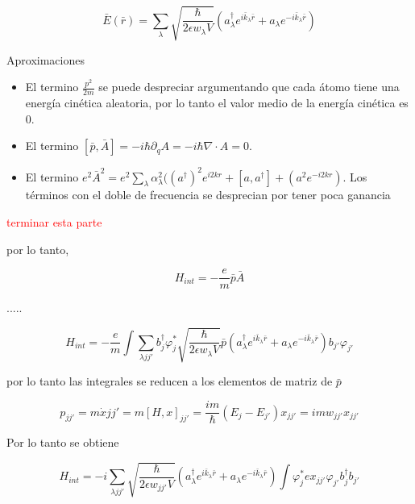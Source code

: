 \begin{equation}
\bar{E}(\bar{r})=\sum_{\lambda}\sqrt{\frac{\hbar}{2\epsilon w_{\lambda}V}} (a^{\dagger}_{\lambda}e^{i\bar{k}_{\lambda}\bar{r}}+a_{\lambda}e^{-i\bar{k}_{\lambda}\bar{r}})
\end{equation}

Aproximaciones

\begin{itemize}
	\item El termino $\frac{p^2}{2m}$ se puede despreciar argumentando que cada átomo tiene una energía cinética aleatoria, por lo tanto el valor medio de la energía cinética es $0$.
	
	\item El termino $[\bar{p},\bar{A}]=-i\hbar\partial_{q}A=-i\hbar\nabla \cdot A=0 $.
	
	\item El termino $e^2\bar{A}^2=e^2\sum_{\lambda}\alpha^2_{\lambda}((a^{\dagger})^2e^{i2kr}+[a,a^{\dagger}]+(a^2e^{-i2kr})$.
	Los términos con el doble de frecuencia se desprecian por tener poca ganancia%
	
\end{itemize}
\textcolor{red}{terminar esta parte}

por lo tanto, 

\begin{equation}
	H_{int}=-\frac{e}{m}\bar{p}\bar{A}
\end{equation}

.....

\begin{equation}
	H_{int}=-\frac{e}{m}\int \sum_{\lambda j j'}b^{\dagger}_j\varphi^*_j \sqrt{\frac{\hbar}{2\epsilon w_{\lambda}V}}\bar{p} (a^{\dagger}_{\lambda}e^{i\bar{k}_{\lambda}\bar{r}}+a_{\lambda}e^{-i\bar{k}_{\lambda}\bar{r}})b_{j'}\varphi_{j'}
\end{equation}

por lo tanto las integrales se reducen a los elementos de matriz de $\bar{p}$

\begin{equation}
	p_{jj'}=m\dot x{jj'}=m[H,x]_{jj'}=\frac{im}{\hbar}(E_j-E_{j'})x_{jj'}=imw_{jj'}x_{jj'}
\end{equation}

Por lo tanto se obtiene

\begin{equation}
	H_{int}=-i\sum_{\lambda j j'} \sqrt{\frac{\hbar}{2\epsilon w_{jj'}V}}  (a^{\dagger}_{\lambda}e^{i\bar{k}_{\lambda}\bar{r}}+a_{\lambda}e^{-i\bar{k}_{\lambda}\bar{r}})    \int \varphi^*_j ex_{jj'}\varphi_{j'} b^{\dagger}_jb_{j'}
\end{equation}


